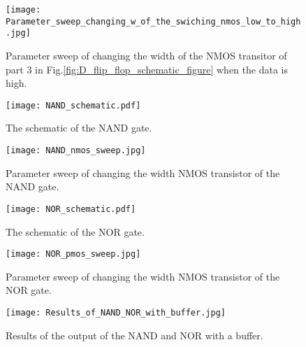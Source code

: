 \begin{appendices}
\begin{figure}[h]
 \texttt{[image: Parameter\_sweep\_changing\_w\_of\_the\_swiching\_nmos\_low\_to\_high.jpg]}
 \caption{Parameter sweep of changing the width of the NMOS transitor of part 3 in Fig.\ref{fig:D_flip_flop_schematic_figure} when the data is high.}
 \label{fig:Parameter_sweep_changing_w_of_the_swiching_nmos_low_to_high_figure}
\end{figure}

\begin{figure}[h]
\texttt{[image: NAND\_schematic.pdf]}
\caption{The schematic of the NAND gate.}
\label{fig:NAND_schematic_figure}
\end{figure}

\begin{figure}[h]
 \texttt{[image: NAND\_nmos\_sweep.jpg]}
 \caption{Parameter sweep of changing the width NMOS transistor of the NAND gate.}
 \label{fig:NAND_nmos_sweep_figure}
\end{figure}

\begin{figure}[h]
\texttt{[image: NOR\_schematic.pdf]}
\caption{The schematic of the NOR gate.}
\label{fig:NOR_schematic_figure}
\end{figure}

\begin{figure}[h]
 \texttt{[image: NOR\_pmos\_sweep.jpg]}
 \caption{Parameter sweep of changing the width NMOS transistor of the NOR gate.}
 \label{fig:NOR_pmos_sweep_figure}
\end{figure}

\begin{figure}[h]
 \texttt{[image: Results\_of\_NAND\_NOR\_with\_buffer.jpg]}
 \caption{Results of the output of the NAND and NOR with a buffer.}
 \label{fig:Results_of_NAND_NOR_with_buffer_figure}
\end{figure}


\end{appendices}
